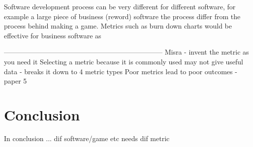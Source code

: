 \documentclass{scrartcl}
\begin{document}
Software development process can be very different for different software, for example a large piece of business (reword) software the process differ from the process behind making a game. Metrics such as burn down charts would be effective for business software as 


\break
---------------------------------------------------------------------  
Misra - invent the metric as you need it
	Selecting a metric because it is commonly used may not give useful data
	- breaks it down to 4 metric types
Poor metrics lead to poor outcomes - paper 5 \cite{Ktata}	



\section{Conclusion}
In conclusion ... dif software/game etc needs dif metric	
	


	
\end{document}
